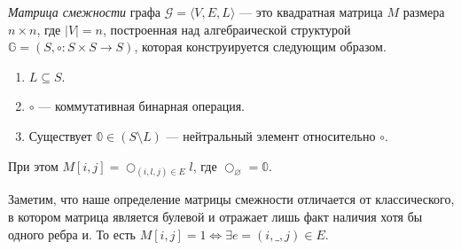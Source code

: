 \begin{definition}
  \textit{Матрица смежности} графа $\mathcal{G}=\langle V,E,L \rangle$ --- это квадратная матрица $M$ размера $n \times n$, где $|V| = n$, построенная над алгебраической структурой $\mathbb{G} = (S,\circ\colon S \times S \to S)$, которая конструируется следующим образом.

  \begin{enumerate}
    \item $L \subseteq S$.
    \item $\circ$ --- коммутативная бинарная операция.
    \item Существует $ \mathbb{0} \in (S \setminus L)$ --- нейтральный элемент относительно $\circ$.    
  \end{enumerate}

  При этом $M[i,j] = \bigcirc_{(i,l,j) \in E}l$, где $\bigcirc_\varnothing = \mathbb{0}$.
\end{definition}

Заметим, что наше определение матрицы смежности отличается от классического, в котором матрица является булевой и отражает лишь факт наличия хотя бы одного ребра и. То есть $M[i,j] = 1 \iff \exists e = (i,\_,j) \in E$.

